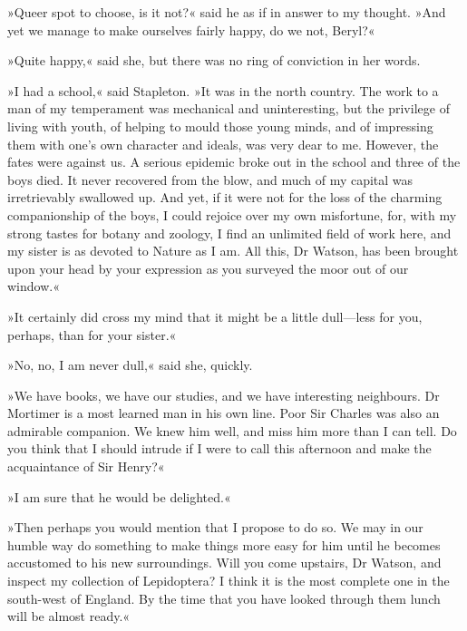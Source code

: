 »Queer spot to choose, is it not?« said he as if in answer to my thought. »And yet we manage to make ourselves fairly happy, do we not, Beryl?«

»Quite happy,« said she, but there was no ring of conviction in her words.

»I had a school,« said Stapleton. »It was in the north country. The work to a man of my temperament was mechanical and uninteresting, but the privilege of living with youth, of helping to mould those young minds, and of impressing them with one's own character and ideals, was very dear to me. However, the fates were against us. A serious epidemic broke out in the school and three of the boys died. It never recovered from the blow, and much of my capital was irretrievably swallowed up. And yet, if it were not for the loss of the charming companionship of the boys, I could rejoice over my own misfortune, for, with my strong tastes for botany and zoology, I find an unlimited field of work here, and my sister is as devoted to Nature as I am. All this, Dr Watson, has been brought upon your head by your expression as you surveyed the moor out of our window.«

»It certainly did cross my mind that it might be a little dull—less for you, perhaps, than for your sister.«

»No, no, I am never dull,« said she, quickly.

»We have books, we have our studies, and we have interesting neighbours. Dr Mortimer is a most learned man in his own line. Poor Sir Charles was also an admirable companion. We knew him well, and miss him more than I can tell. Do you think that I should intrude if I were to call this afternoon and make the acquaintance of Sir Henry?«

»I am sure that he would be delighted.«


»Then perhaps you would mention that I propose to do so. We may in our humble way do something to make things more easy for him until he becomes accustomed to his new surroundings. Will you come upstairs, Dr Watson, and inspect my collection of Lepidoptera? I think it is the most complete one in the south-west of England. By the time that you have looked through them lunch will be almost ready.«

